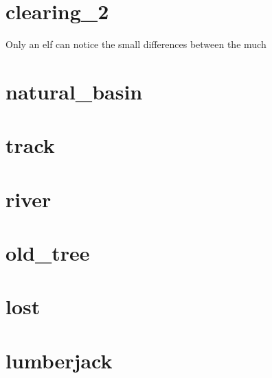 \section{clearing_2}

Only an elf can notice the small differences between the much
\section{natural_basin}
\section{track}
\section{river}
\section{old_tree}
\section{lost}
\section{lumberjack}
